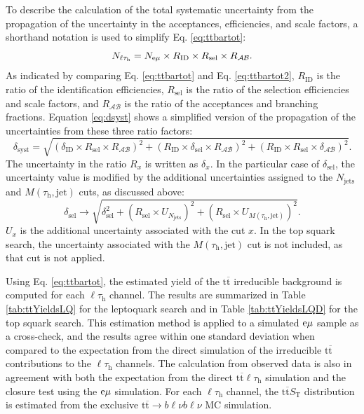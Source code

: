 \documentclass[12pt]{thesis}  %
\newcommand{\tauh}{\ensuremath{\tau_{\text{h}}}\xspace}
\newcommand{\Pe}{\ensuremath{\cmsSymbolFace{e}}\xspace}
\newcommand{\emu}{\ensuremath{\Pe\mu}\xspace}
\newcommand{\ltau}{\ensuremath{\ell\tauh}\xspace}
\renewcommand{\ttbar}{\ensuremath{\mathrm{t}\overline{\mathrm{t}}}\xspace}
\def\ST{\ensuremath{S_{\text{T}}}\xspace}
\def\MassTJ{\ensuremath{M(\tauh,\text{jet})}\xspace}
\begin{document}
To describe the calculation of the total systematic uncertainty from the propagation of the uncertainty in the acceptances, efficiencies, and scale factors, a shorthand notation is used to simplify Eq. \eqref{eq:ttbartot}:
\begin{equation}
\label{eq:ttbartot2}
N_{\ltau} = N_{\emu} \times R_{\text{ID}} \times R_{\text{sel}} \times R_{\mathcal{A}\mathcal{B}}.
\end{equation}
As indicated by comparing Eq. \eqref{eq:ttbartot} and Eq. \eqref{eq:ttbartot2}, $R_{\text{ID}}$ is the ratio of the identification efficiencies, $R_{\text{sel}}$ is the ratio of the selection efficiencies and scale factors, and $R_{\mathcal{A}\mathcal{B}}$ is the ratio of the acceptances and branching fractions. Equation \eqref{eq:dsyst} shows a simplified version of the propagation of the uncertainties from these three ratio factors:
\begin{equation}
\label{eq:dsyst}
\delta_{\text{syst}} = \sqrt{ (\delta_{\text{ID}} \times R_{\text{sel}} \times R_{\mathcal{A}\mathcal{B}})^2 + (R_{\text{ID}} \times \delta_{\text{sel}} \times R_{\mathcal{A}\mathcal{B}})^2 + (R_{\text{ID}} \times R_{\text{sel}} \times \delta_{\mathcal{A}\mathcal{B}})^2}.
\end{equation}
The uncertainty in the ratio $R_x$ is written as $\delta_x$. In the particular case of $\delta_{\text{sel}}$, the uncertainty value is modified by the additional uncertainties assigned to the $N_{\text{jets}}$ and \MassTJ cuts, as discussed above:
\begin{equation}
\delta_{\text{sel}} \rightarrow \sqrt{ \delta_{\text{sel}}^2 + (R_{\text{sel}} \times U_{N_{\text{jets}}})^2 + (R_{\text{sel}} \times U_{\MassTJ})^2}.
\end{equation}
$U_x$ is the additional uncertainty associated with the cut $x$. In the top squark search, the uncertainty associated with the \MassTJ cut is not included, as that cut is not applied.

Using Eq. \ref{eq:ttbartot}, the estimated yield of the \ttbar irreducible background is computed for each \ltau channel. The results are summarized in Table \ref{tab:ttYieldsLQ} for the leptoquark search and in Table \ref{tab:ttYieldsLQD} for the top squark search. This estimation method is applied to a simulated \emu sample as a cross-check, and the results agree within one standard deviation when compared to the expectation from the direct simulation of the irreducible \ttbar contributions to the \ltau channels. The calculation from observed data is also in agreement with both the expectation from the direct \ttbar \ltau simulation and the closure test using the \emu simulation. For each \ltau channel, the \ttbar \ST distribution is estimated from the exclusive $\ttbar \rightarrow b\ell\nu b\ell\nu$ MC simulation.
\end{document}
